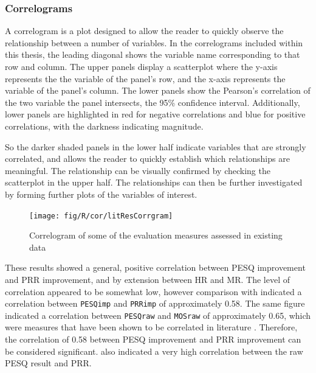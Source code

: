 \begin{minipage}[t]{1\columnwidth}%
\begin{shaded}%

\subsubsection*{Correlograms}

A correlogram is a plot designed to allow the reader to quickly observe
the relationship between a number of variables. In the correlograms
included within this thesis, the leading diagonal shows the variable
name corresponding to that row and column. The upper panels display
a scatterplot where the y-axis represents the the variable of the
panel's row, and the x-axis represents the variable of the panel's
column. The lower panels show the Pearson's correlation of the two
variable the panel intersects, the 95\% confidence interval. Additionally,
lower panels are highlighted in red for negative correlations and
blue for positive correlations, with the darkness indicating magnitude.

So the darker shaded panels in the lower half indicate variables that
are strongly correlated, and allows the reader to quickly establish
which relationships are meaningful. The relationship can be visually
confirmed by checking the scatterplot in the upper half. The relationships
can then be further investigated by forming further plots of the variables
of interest.\end{shaded}%
\end{minipage}

\begin{figure}[H]
\noindent \begin{centering}
\texttt{[image: fig/R/cor/litResCorrgram]}
\par\end{centering}

\protect\caption{\label{fig:litResCorr}Correlogram of some of the evaluation measures
assessed in existing data}
\end{figure}


These results showed a general, positive correlation between \ac{PESQ}
improvement and \ac{PRR} improvement, and by extension between \ac{HR}
and \ac{MR}. The level of correlation appeared to be somewhat low,
however comparison with  indicated a correlation
between \lstinline!PESQimp! and \lstinline!PRRimp! of approximately
0.58. The same figure indicated a correlation between \lstinline!PESQraw!
and \lstinline!MOSraw! of approximately 0.65, which were measures
that have been shown to be correlated in literature \citep{Kitawaki2007,Rix2003,Rix2001}.
Therefore, the correlation of 0.58 between \ac{PESQ} improvement
and \ac{PRR} improvement can be considered significant. 
also indicated a very high correlation between the raw \ac{PESQ}
result and \ac{PRR}.

